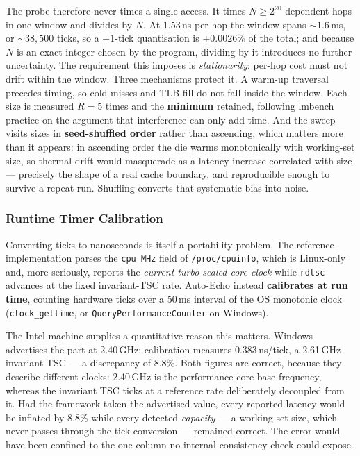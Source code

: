 \documentclass[conference]{IEEEtran}
\begin{document}
The probe therefore never times a single access. It times $N \geq 2^{20}$
dependent hops in one window and divides by $N$. At 1.53\,ns per hop the window
spans ${\sim}1.6$\,ms, or ${\sim}38{,}500$ ticks, so a $\pm 1$-tick quantisation
is $\pm 0.0026\%$ of the total; and because $N$ is an exact integer chosen by the
program, dividing by it introduces no further uncertainty. The requirement this
imposes is \emph{stationarity}: per-hop cost must not drift within the window.
Three mechanisms protect it. A warm-up traversal precedes timing, so cold misses
and TLB fill do not fall inside the window. Each size is measured $R=5$ times and
the \textbf{minimum} retained, following lmbench practice \citep{mcvoy1996} on the
argument that interference can only add time. And the sweep visits sizes in \textbf{seed-shuffled order} rather than
ascending, which matters more than it appears: in ascending order the die warms
monotonically with working-set size, so thermal drift would masquerade as a
latency increase correlated with size --- precisely the shape of a real cache
boundary, and reproducible enough to survive a repeat run. Shuffling converts that
systematic bias into noise.

\subsubsection{Runtime Timer Calibration}

Converting ticks to nanoseconds is itself a portability problem. The reference
implementation parses the \texttt{cpu MHz} field of \texttt{/proc/cpuinfo}, which
is Linux-only and, more seriously, reports the \emph{current turbo-scaled core
clock} while \texttt{rdtsc} advances at the fixed invariant-TSC rate. Auto-Echo
instead \textbf{calibrates at run time}, counting hardware ticks over a 50\,ms
interval of the OS monotonic clock (\texttt{clock\_gettime}, or
\texttt{QueryPerformanceCounter} on Windows).

The Intel machine supplies a quantitative reason this matters. Windows advertises
the part at 2.40\,GHz; calibration measures 0.383\,ns/tick, a 2.61\,GHz invariant
TSC --- a discrepancy of 8.8\%. Both figures are correct, because they describe
different clocks: 2.40\,GHz is the performance-core base frequency, whereas the
invariant TSC ticks at a reference rate deliberately decoupled from it. Had the
framework taken the advertised value, every reported latency would be inflated by
8.8\% while every detected \emph{capacity} --- a working-set size, which never
passes through the tick conversion --- remained correct. The error would have been
confined to the one column no internal consistency check could expose.
\end{document}
